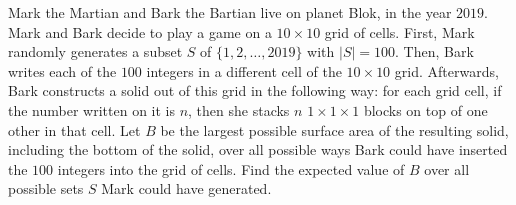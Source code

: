 Mark the Martian and Bark the Bartian live on planet Blok, in the year $2019$. Mark and Bark decide to play a game on a $10 \times 10$ grid of cells. First, Mark randomly generates a subset $S$ of $\{1, 2, \dots, 2019\}$ with $|S|=100$. Then, Bark writes each of the $100$ integers in a different cell of the $10 \times 10$ grid. Afterwards, Bark constructs a solid out of this grid in the following way: for each grid cell, if the number written on it is $n$, then she stacks $n$ $1 \times 1 \times 1$ blocks on top of one other in that cell. Let $B$ be the largest possible surface area of the resulting solid, including the bottom of the solid, over all possible ways Bark could have inserted the $100$ integers into the grid of cells. Find the expected value of $B$ over all possible sets $S$ Mark could have generated.
